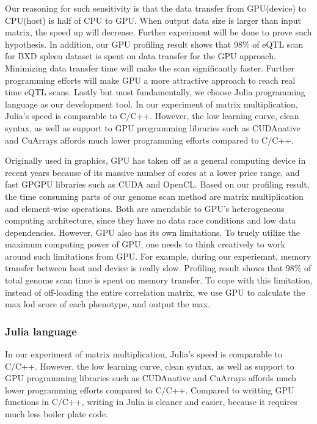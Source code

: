 \documentclass[9pt,twocolumn,twoside,lineno]{gsag3jnl}
\begin{document}
	Our reasoning for such sensitivity is that the data transfer from GPU(device) to CPU(host) is half of CPU to GPU. 
	When output data size is larger than input matrix, the speed up will decrease. 
	Further experiment will be done to prove such hypothesis. 
	In addition, our GPU profiling result shows that 98\% of eQTL scan for BXD spleen dataset is spent on data transfer for the GPU approach. 
	Minimizing data transfer time will make the scan significantly faster. 
	Further programming efforts will make GPU a more attractive approach to reach real time eQTL scans. 
	Lastly but most fundamentally, we choose Julia programming language as our development tool. 
	In our experiment of matrix multiplication, Julia's speed is comparable to C/C++. 
	However, the low learning curve, clean syntax, as well as support to GPU programming libraries such as CUDAnative and CuArrays affords much lower programming efforts compared to C/C++.
\fi

Originally used in graphics, GPU has taken off as a general computing device in recent years because of its massive number of cores at a lower price range, and fast GPGPU libraries such as CUDA and OpenCL.
Based on our profiling result, the time consuming parts of our genome scan method are matrix multiplication and element-wise operations. 
Both are amendable to GPU's heterogeneous computing architecture, since they have no data race conditions and low data dependencies. 
However, GPU also has its own limitations. 
To truely utilize the maximum computing power of GPU, one needs to think creatively to work around such limitations from GPU. 
For example, during our experiemnt, memory transfer between host and device is really slow. 
Profiling result shows that 98\% of total genome scan time is spent on memory transfer. 
To cope with this limitation, instead of off-loading the entire correlation matrix, we use GPU to calculate the max lod score of each phenotype, and output the max. 

\subsubsection{Julia language}
In our experiment of matrix multiplication, Julia's speed is comparable to C/C++. 
However, the low learning curve, clean syntax, as well as support to GPU programming libraries such as CUDAnative and CuArrays affords much lower programming efforts compared to C/C++.
Compared to writting GPU functions in C/C++, writing in Julia is cleaner and easier, because it requires much less boiler plate code.
\end{document}
